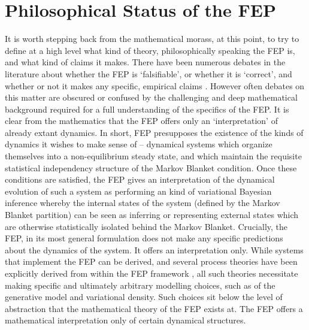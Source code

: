 \section{Philosophical Status of the FEP}
It is worth stepping back from the mathematical morass, at this point, to try to define at a high level what kind of theory, philosophically speaking the FEP is, and what kind of claims it makes. There have been numerous debates in the literature about whether the FEP is `falsifiable', or whether it is `correct', and whether or not it makes any specific, empirical claims \citep{williams2020brain,andrews2020math}. However often debates on this matter are obscured or confused by the challenging and deep mathematical background required for a full understanding of the specifics of the FEP. It is clear from the mathematics that the FEP offers only an `interpretation' of already extant dynamics. In short, FEP presupposes the existence of the kinds of dynamics it wishes to make sense of -- dynamical systems which organize themselves into a non-equilibrium steady state, and which maintain the requisite statistical independency structure of the Markov Blanket condition. Once these conditions are satisfied, the FEP gives an interpretation of the dynamical evolution of such a system as performing an kind of variational Bayesian inference whereby the internal states of the system (defined by the Markov Blanket partition) can be seen as inferring or representing external states which are otherwise statistically isolated behind the Markov Blanket. Crucially, the FEP, in its most general formulation does not make any specific predictions about the dynamics of the system. It offers an interpretation only. While systems that implement the FEP can be derived, and several process theories have been explicitly derived from within the FEP framework \citep{friston2005theory,friston2015active}, all such theories necessitate making specific and ultimately arbitrary modelling choices, such as of the generative model and variational density. Such choices sit below the level of abstraction that the mathematical theory of the FEP exists at. The FEP offers a mathematical interpretation only of certain dynamical structures.

